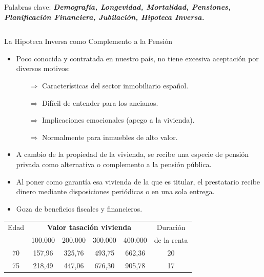 \documentclass[]{beamer}
\begin{document}
\begin{frame}{\vspace{1ex}\hfill Palabras clave: \bfseries \textit{Demograf\'ia, Longevidad, Mortalidad, Pensiones, Planificaci\'on Financiera, Jubilaci\'on, Hipoteca Inversa.}}
\begin{columns}[t]
		\vspace{-1cm}
		\begin{block}{La Hipoteca Inversa como Complemento a la Pensi\'on}\vspace{-0.8cm}
			\begin{multicols}{2}
					\setlength{\parindent}{1.2em}	
					\setlength{\parskip}{1ex}
				\begin{itemize}
					\item Poco conocida y  contratada en nuestro pa\'is, no tiene excesiva aceptaci\'on por diversos motivos:
						\begin{enumerate}
							\item[$\Rightarrow$] Caracter\'isticas del sector inmobiliario espa\~nol.
							\item[$\Rightarrow$] Dif\'icil de entender para los ancianos.
							\item[$\Rightarrow$] Implicaciones emocionales (apego a la vivienda).
							\item[$\Rightarrow$] Normalmente para inmuebles de alto valor.					
						\end{enumerate}
					\item A cambio de la propiedad de la vivienda, se recibe una especie de pensi\'on privada como alternativa o complemento a la pensi\'on p\'ublica.
					\item Al poner como garant\'ia esa vivienda de la que es titular, el prestatario recibe dinero mediante disposiciones peri\'odicas o en una sola entrega.
					\item Goza de beneficios fiscales y financieros.
					\end{itemize}
					\vspace{-1cm}		
					\begin{table}[h] 
						\begin{tabular}{|c|c|c|c|c|c|}
							\hline
							Edad & \multicolumn{4}{|c|}{\bfseries Valor tasaci\'on vivienda} & Duraci\'on\\ \cline{2-5}
							 & 100.000 & 200.000 & 300.000 & 400.000 & de la renta \\ \hline
							 \rowcolor[gray]{0.8}70 & 157,96 & 325,76 & 493,75 & 662,36 & 20 \\ \hline
							 75 & 218,49 & 447,06 & 676,30 & 905,78 & 17 \\ \hline

\end{tabular}
\end{table}
\end{multicols}
\end{block}
\end{columns}
\end{frame}
\end{document}
